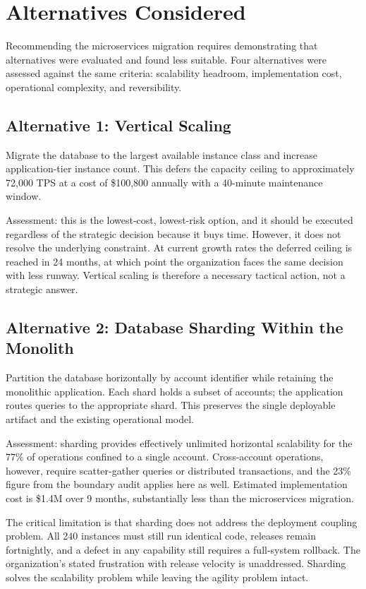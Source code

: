 \section{Alternatives Considered}

Recommending the microservices migration requires demonstrating that alternatives were evaluated and found less suitable. Four alternatives were assessed against the same criteria: scalability headroom, implementation cost, operational complexity, and reversibility.

\subsection{Alternative 1: Vertical Scaling}

Migrate the database to the largest available instance class and increase application-tier instance count. This defers the capacity ceiling to approximately 72,000 TPS at a cost of \$100,800 annually with a 40-minute maintenance window.

Assessment: this is the lowest-cost, lowest-risk option, and it should be executed regardless of the strategic decision because it buys time. However, it does not resolve the underlying constraint. At current growth rates the deferred ceiling is reached in 24 months, at which point the organization faces the same decision with less runway. Vertical scaling is therefore a necessary tactical action, not a strategic answer.

\subsection{Alternative 2: Database Sharding Within the Monolith}

Partition the database horizontally by account identifier while retaining the monolithic application. Each shard holds a subset of accounts; the application routes queries to the appropriate shard. This preserves the single deployable artifact and the existing operational model.

Assessment: sharding provides effectively unlimited horizontal scalability for the 77\% of operations confined to a single account. Cross-account operations, however, require scatter-gather queries or distributed transactions, and the 23\% figure from the boundary audit applies here as well. Estimated implementation cost is \$1.4M over 9 months, substantially less than the microservices migration.

The critical limitation is that sharding does not address the deployment coupling problem. All 240 instances must still run identical code, releases remain fortnightly, and a defect in any capability still requires a full-system rollback. The organization's stated frustration with release velocity is unaddressed. Sharding solves the scalability problem while leaving the agility problem intact.


